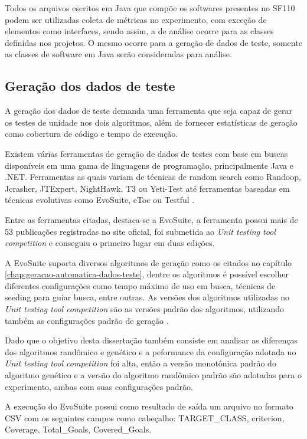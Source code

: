 \documentclass[
	12pt,				%
	oneside,			%
	a4paper,			%
	english,			%
	brazil				%
	]{abntex2ppgsi}
\begin{document}
Todos os arquivos escritos em Java que compõe os softwares presentes no SF110 podem ser utilizadas coleta de métricas no experimento, com exceção de elementos como interfaces, sendo assim, a de análise ocorre para as classes definidas nos projetos. O mesmo ocorre para a geração de dados de teste, somente as classes de software em Java serão consideradas para análise.

\subsection{Geração dos dados de teste}

A geração dos dados de teste demanda uma ferramenta que seja capaz de gerar os testes de unidade nos dois algoritmos, além de fornecer estatísticas de geração como cobertura de código e tempo de execução.

Existem várias ferramentas de geração de dados de testes com base em buscas disponíveis em uma gama de linguagens de programação, principalmente Java e .NET. Ferramentas as quais variam de técnicas de random search como Randoop, Jcrasher, JTExpert, NightHawk, T3 ou Yeti-Test até ferramentas baseadas em técnicas evolutivas como EvoSuite, eToc ou Testful \cite{shamriski20151115}. 

Entre as ferramentas citadas, destaca-se a EvoSuite, a ferramenta possui mais de 53 publicações registradas no site oficial, foi submetida ao \textit{Unit testing tool competition} e conseguiu o primeiro lugar em duas edições.

A EvoSuite suporta diversos algoritmos de geração como os citados no capítulo \ref{chap:geracao-automatica-dados-teste}, dentre os algoritmos é possível escolher diferentes configurações como tempo máximo de uso em busca, técnicas de seeding para guiar busca, entre outras. As versões dos algoritmos utilizadas no \textit{Unit testing tool competition} são as versões padrão dos algoritmos, utilizando também as configurações padrão de geração \cite{shamriski20151115}. 

Dado que o objetivo desta dissertação também consiste em analisar  as diferenças dos algoritmos randômico e genético  e a peformance da configuração adotada no \textit{Unit testing tool competition} foi alta, então a versão monotônica padrão do algoritmo genético e a versão do algoritmo randômico padrão são adotadas para o experimento, ambas com suas configurações padrão.

A execução do EvoSuite possui como resultado de saída um arquivo no formato CSV com os seguintes campos como cabeçalho: TARGET\_CLASS, criterion, Coverage, Total\_Goals, Covered\_Goals. 
\end{document}
